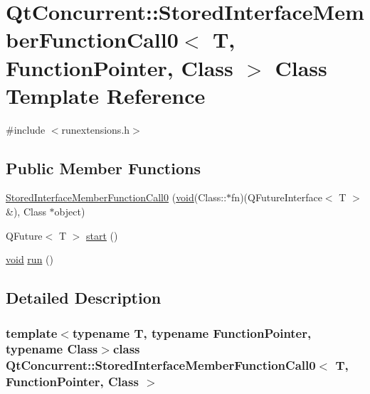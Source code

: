 \hypertarget{class_qt_concurrent_1_1_stored_interface_member_function_call0}{\section{\-Qt\-Concurrent\-:\-:\-Stored\-Interface\-Member\-Function\-Call0$<$ \-T, \-Function\-Pointer, \-Class $>$ \-Class \-Template \-Reference}
\label{class_qt_concurrent_1_1_stored_interface_member_function_call0}
}


{\ttfamily \#include $<$runextensions.\-h$>$}

\subsection*{\-Public \-Member \-Functions}
\begin{DoxyCompactItemize}
\item 
\hyperlink{class_qt_concurrent_1_1_stored_interface_member_function_call0_a318534c7b82ac4bb7f5f6e4b3dec6855}{\-Stored\-Interface\-Member\-Function\-Call0} (\hyperlink{group___u_a_v_objects_plugin_ga444cf2ff3f0ecbe028adce838d373f5c}{void}(\-Class\-::$\ast$fn)(\-Q\-Future\-Interface$<$ \-T $>$ \&), \-Class $\ast$object)
\item 
\-Q\-Future$<$ \-T $>$ \hyperlink{class_qt_concurrent_1_1_stored_interface_member_function_call0_a1bcda6c339be56bbafd3237610bcd43a}{start} ()
\item 
\hyperlink{group___u_a_v_objects_plugin_ga444cf2ff3f0ecbe028adce838d373f5c}{void} \hyperlink{class_qt_concurrent_1_1_stored_interface_member_function_call0_a73dd6986a46d6015436694695eeb50b4}{run} ()
\end{DoxyCompactItemize}


\subsection{\-Detailed \-Description}
\subsubsection*{template$<$typename T, typename Function\-Pointer, typename Class$>$class Qt\-Concurrent\-::\-Stored\-Interface\-Member\-Function\-Call0$<$ T, Function\-Pointer, Class $>$}



